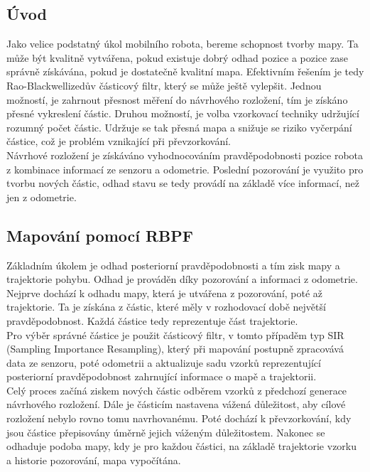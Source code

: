 \documentclass[11pt]{article}
\begin{document}
\subsection{Úvod}
Jako velice podstatný úkol mobilního robota, bereme schopnost tvorby mapy. Ta může být kvalitně vytvářena, pokud existuje dobrý odhad pozice a pozice zase správně získávána, pokud je dostatečně kvalitní mapa. Efektivním řešením je tedy Rao-Blackwellizedův částicový filtr, který se může ještě vylepšit. Jednou možností, je zahrnout přesnost měření do návrhového rozložení, tím je získáno přesné vykreslení částic. Druhou možností, je volba vzorkovací techniky udržující rozumný počet částic. Udržuje se tak přesná mapa a snižuje se riziko vyčerpání částice, což je problém vznikající při převzorkování.\\
\indent Návrhové rozložení je získáváno vyhodnocováním pravděpodobnosti pozice robota z kombinace informací ze senzoru a odometrie. Poslední pozorování je využito pro tvorbu nových částic, odhad stavu se tedy provádí na základě více informací, než jen z odometrie. 

\subsection{Mapování pomocí RBPF}
Základním úkolem je odhad posteriorní pravděpodobnosti a tím zisk mapy a trajektorie pohybu. Odhad je prováděn díky pozorování a informaci z odometrie. Nejprve dochází k odhadu mapy, která je utvářena z pozorování, poté až trajektorie. Ta je získána z částic, které měly v rozhodovací době největší pravděpodobnost. Každá částice tedy reprezentuje část trajektorie.\\
\indent Pro výběr správné částice je použit částicový filtr, v tomto případěm typ SIR (Sampling Importance Resampling), který při mapování postupně zpracovává data ze senzoru, poté odometrii a aktualizuje sadu vzorků reprezentující posteriorní pravděpodobnost zahrnující informace o mapě a trajektorii. \\
\indent Celý proces začíná ziskem nových částic odběrem vzorků z předchozí generace návrhového rozložení. Dále je částicím nastavena vážená důležitost, aby cílové rozložení nebylo rovno tomu navrhovanému. Poté dochází k převzorkování, kdy jsou částice přepisovány úměrně jejich váženým důležitostem. Nakonec se odhaduje podoba mapy, kdy je pro každou částici, na základě trajektorie vzorku a historie pozorování, mapa vypočítána.
\end{document}
